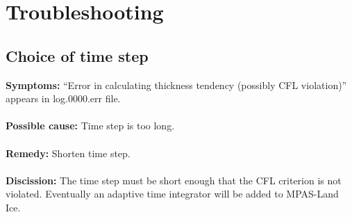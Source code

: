 \chapter{Troubleshooting}
\label{chap:troubleshooting}

\section{Choice of time step}

{\bf Symptoms:} ``Error in calculating thickness tendency (possibly CFL violation)'' appears in log.0000.err file.
\\ \\
{\bf Possible cause:} Time step is too long.
\\ \\
{\bf Remedy:}  Shorten time step.  
\\ \\
{\bf Discission:}  The time step must be short enough that the CFL criterion is not violated.  Eventually an adaptive time integrator will be added to MPAS-Land Ice.


